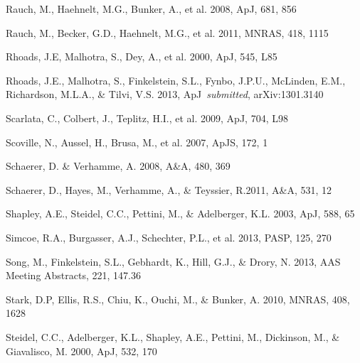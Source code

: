 \documentclass{emulateapj}
\def\apj{ApJ}
\def\apjs{ApJS}
\def\mnras{MNRAS}
\def\aap{A\&A}
\def\pasp{PASP}
\begin{document}
\begin{thebibliography}{}
 Rauch, M., Haehnelt, M.G., Bunker, A., et al. 2008, \apj, 681, 856

 Rauch, M., Becker, G.D., Haehnelt, M.G., et al. 2011, \mnras, 418, 1115

 Rhoads, J.E, Malhotra, S., Dey, A., et al. 2000, \apj, 545, L85

 Rhoads, J.E., Malhotra, S., Finkelstein, S.L., Fynbo, J.P.U., McLinden, E.M., Richardson, M.L.A., \& Tilvi, V.S. 2013, \apj\ \textit{submitted}, arXiv:1301.3140

 Scarlata, C., Colbert, J., Teplitz, H.I., et al. 2009, \apj, 704, L98

 Scoville, N., Aussel, H., Brusa, M., et al. 2007, \apjs, 172, 1

 Schaerer, D. \& Verhamme, A. 2008, \aap, 480, 369

 Schaerer, D., Hayes, M., Verhamme, A., \& Teyssier, R.2011, \aap, 531, 12

 Shapley, A.E., Steidel, C.C., Pettini, M., \& Adelberger, K.L. 2003, \apj, 588, 65

 Simcoe, R.A., Burgasser, A.J., Schechter, P.L., et al. 2013, \pasp, 125, 270

 Song, M., Finkelstein, S.L., Gebhardt, K., Hill, G.J., \& Drory, N. 2013, AAS Meeting Abstracts, 221, 147.36

 Stark, D.P, Ellis, R.S., Chiu, K., Ouchi, M., \& Bunker, A. 2010, \mnras, 408, 1628

 Steidel, C.C., Adelberger, K.L., Shapley, A.E., Pettini, M., Dickinson, M., \& Giavalisco, M. 2000, \apj, 532, 170


\end{thebibliography}
\end{document}
